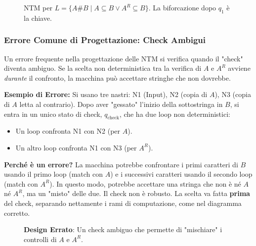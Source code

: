 \documentclass[a4paper]{article}
\theoremstyle{definition} %
\begin{document}
\begin{figure}[h!]
{
}
\caption{NTM per $L = \{A\#B \mid A \subseteq B \lor A^R \subseteq B \}$. La biforcazione dopo $q_1$ è la chiave.}
\end{figure}

\subsubsection{Errore Comune di Progettazione: Check Ambigui}
Un errore frequente nella progettazione delle NTM si verifica quando il "check" diventa ambiguo. Se la scelta non deterministica tra la verifica di $A$ e $A^R$ avviene \emph{durante} il confronto, la macchina può accettare stringhe che non dovrebbe.

\textbf{Esempio di Errore:} Si usano tre nastri: N1 (Input), N2 (copia di $A$), N3 (copia di $A$ letta al contrario). Dopo aver "gessato" l'inizio della sottostringa in $B$, si entra in un unico stato di check, $q_{\text{check}}$, che ha due loop non deterministici:
\begin{itemize}
    \item Un loop confronta N1 con N2 (per $A$).
    \item Un altro loop confronta N1 con N3 (per $A^R$).
\end{itemize}
\textbf{Perché è un errore?} La macchina potrebbe confrontare i primi caratteri di $B$ usando il primo loop (match con $A$) e i successivi caratteri usando il secondo loop (match con $A^R$). In questo modo, potrebbe accettare una stringa che non è né $A$ né $A^R$, ma un "misto" delle due. Il check non è robusto. La scelta va fatta \textbf{prima} del check, separando nettamente i rami di computazione, come nel diagramma corretto.

\begin{figure}[h!]
\centering
{}
\caption{\textbf{Design Errato}: Un check ambiguo che permette di "mischiare" i controlli di $A$ e $A^R$.}
\end{figure}
\end{document}

